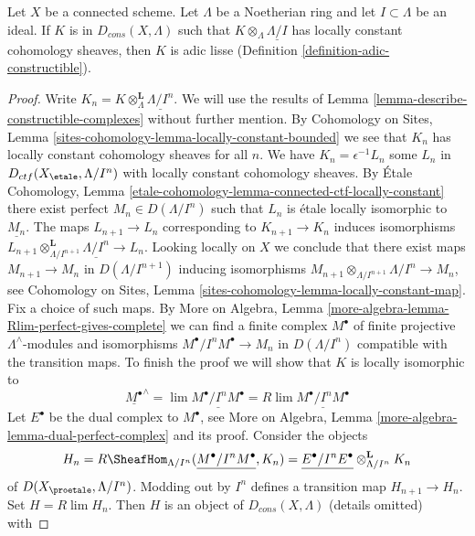 \begin{lemma}
\label{lemma-connected-adic-lisse}
Let $X$ be a connected scheme. Let $\Lambda$ be a Noetherian ring and let
$I \subset \Lambda$ be an ideal. If $K$ is in $D_{cons}(X, \Lambda)$
such that $K \otimes_\Lambda \underline{\Lambda/I}$
has locally constant cohomology sheaves, then $K$ is adic lisse
(Definition \ref{definition-adic-constructible}).
\end{lemma}

\begin{proof}
Write $K_n = K \otimes_\Lambda^\mathbf{L} \underline{\Lambda/I^n}$.
We will use the results of Lemma \ref{lemma-describe-constructible-complexes}
without further mention. By Cohomology on Sites, Lemma
\ref{sites-cohomology-lemma-locally-constant-bounded}
we see that $K_n$ has locally constant cohomology sheaves for all $n$.
We have $K_n = \epsilon^{-1}L_n$ some $L_n$ in
$D_{ctf}(X_\etale, \Lambda/I^n)$ with locally constant cohomology sheaves.
By \'Etale Cohomology, Lemma
\ref{etale-cohomology-lemma-connected-ctf-locally-constant}
there exist perfect $M_n \in D(\Lambda/I^n)$
such that $L_n$ is \'etale locally isomorphic to $\underline{M_n}$.
The maps $L_{n + 1} \to L_n$ corresponding to $K_{n + 1} \to K_n$
induces isomorphisms
$L_{n + 1} \otimes_{\Lambda/I^{n + 1}}^\mathbf{L} \underline{\Lambda/I^n}
\to L_n$. Looking locally on $X$ we conclude that there
exist maps $M_{n + 1} \to M_n$ in $D(\Lambda/I^{n + 1})$
inducing isomorphisms
$M_{n + 1} \otimes_{\Lambda/I^{n + 1}} \Lambda/I^n \to M_n$, see
Cohomology on Sites, Lemma \ref{sites-cohomology-lemma-locally-constant-map}.
Fix a choice of such maps. By
More on Algebra, Lemma \ref{more-algebra-lemma-Rlim-perfect-gives-complete}
we can find a finite complex $M^\bullet$ of finite projective
$\Lambda^\wedge$-modules and isomorphisms $M^\bullet/I^nM^\bullet \to M_n$
in $D(\Lambda/I^n)$ compatible with the transition maps.
To finish the proof we will show that $K$ is locally isomorphic
to
$$
\underline{M^\bullet}^\wedge =
\lim \underline{M^\bullet/I^nM^\bullet} =
R\lim \underline{M^\bullet/I^nM^\bullet}
$$
Let $E^\bullet$ be the dual complex to $M^\bullet$, see
More on Algebra, Lemma \ref{more-algebra-lemma-dual-perfect-complex}
and its proof. Consider the objects
$$
H_n =
R\SheafHom_{\Lambda/I^n}(\underline{M^\bullet/I^nM^\bullet}, K_n) =
\underline{E^\bullet/I^nE^\bullet} \otimes_{\Lambda/I^n}^\mathbf{L} K_n
$$
of $D(X_\proetale, \Lambda/I^n)$. Modding out by $I^n$ defines a
transition map $H_{n + 1} \to H_n$. Set $H = R\lim H_n$. Then $H$ is an
object of $D_{cons}(X, \Lambda)$ (details omitted) with

\end{proof}
